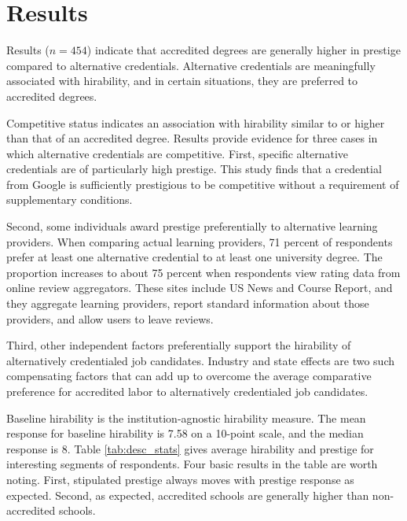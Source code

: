 \documentclass[review]{elsarticle}
\begin{document}
\section{Results}

Results ($n = 454$) indicate that accredited degrees are generally higher in prestige compared to alternative credentials.
Alternative credentials are meaningfully associated with hirability,
and in certain situations, they are preferred to accredited degrees.

Competitive status indicates an association with hirability similar to or higher than that of an accredited degree.
Results provide evidence for three cases in which alternative credentials are competitive.
First, specific alternative credentials are of particularly high prestige.
This study finds that a credential from Google is sufficiently prestigious to be competitive without a requirement of supplementary conditions.

Second, some individuals award prestige preferentially to alternative learning providers.
When comparing actual learning providers,
71 percent of respondents prefer at least one alternative credential to at least one university degree.
The proportion increases to about 75 percent when respondents view rating data from online review aggregators.
These sites include US News and Course Report, and they aggregate learning providers,
report standard information about those providers,
and allow users to leave reviews.

Third, other independent factors preferentially support the hirability of alternatively credentialed job candidates.
Industry and state effects are two such compensating factors that can add up to overcome the average comparative preference for accredited labor to alternatively credentialed job candidates.

Baseline hirability is the institution-agnostic hirability measure.
The mean response for baseline hirability is 7.58 on a 10-point scale, and the median response is 8.
Table \ref{tab:desc_stats} gives average hirability and prestige for interesting segments of respondents.
Four basic results in the table are worth noting.
First, stipulated prestige always moves with prestige response as expected.
Second, as expected, accredited schools are generally higher than non-accredited schools.
\end{document}
